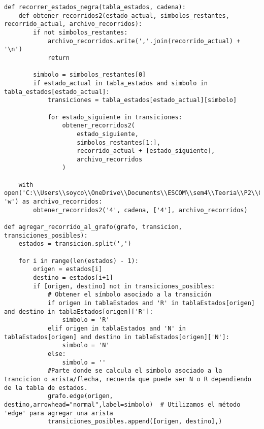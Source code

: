 \begin{enumerate}
\begin{lstlisting}
def recorrer_estados_negra(tabla_estados, cadena):
    def obtener_recorridos2(estado_actual, simbolos_restantes, recorrido_actual, archivo_recorridos):
        if not simbolos_restantes:
            archivo_recorridos.write(','.join(recorrido_actual) + '\n')
            return

        simbolo = simbolos_restantes[0]
        if estado_actual in tabla_estados and simbolo in tabla_estados[estado_actual]:
            transiciones = tabla_estados[estado_actual][simbolo]

            for estado_siguiente in transiciones:
                obtener_recorridos2(
                    estado_siguiente,
                    simbolos_restantes[1:],
                    recorrido_actual + [estado_siguiente],
                    archivo_recorridos
                )

    with open('C:\\Users\\soyco\\OneDrive\\Documents\\ESCOM\\sem4\\Teoria\\P2\\Chess\\output\\recorridos_negra.txt', 'w') as archivo_recorridos:
        obtener_recorridos2('4', cadena, ['4'], archivo_recorridos)

def agregar_recorrido_al_grafo(grafo, transicion, transiciones_posibles):
    estados = transicion.split(',')

    for i in range(len(estados) - 1):
        origen = estados[i]
        destino = estados[i+1]
        if [origen, destino] not in transiciones_posibles:
            # Obtener el símbolo asociado a la transición
            if origen in tablaEstados and 'R' in tablaEstados[origen] and destino in tablaEstados[origen]['R']:
                simbolo = 'R'
            elif origen in tablaEstados and 'N' in tablaEstados[origen] and destino in tablaEstados[origen]['N']:
                simbolo = 'N'
            else:
                simbolo = ''
            #Parte donde se calcula el simbolo asociado a la trancicion o arista/flecha, recuerda que puede ser N o R dependiendo de la tabla de estados.
            grafo.edge(origen, destino,arrowhead="normal",label=simbolo)  # Utilizamos el método 'edge' para agregar una arista
            transiciones_posibles.append([origen, destino],)
    


\end{lstlisting}
\end{enumerate}
